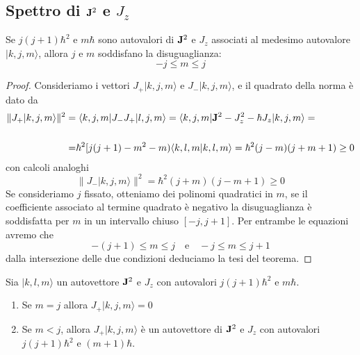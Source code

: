 \subsection{Spettro di $\bold{J}^2$ e $J_z$}

\begin{theorem}
Se $j(j+1)\hbar^2$ e $m\hbar$ sono autovalori di $\bold{J}^2$ e $J_z$ associati al medesimo autovalore $|k,j,m \rangle$, allora $j$ e $m$ soddisfano la disuguaglianza:
\begin{equation*}
	- j \leq m \leq j
\end{equation*}	
\end{theorem}
\begin{proof}
 Consideriamo i vettori $J_+|k,j,m \rangle$ e $J_-|k,j,m \rangle$, e il quadrato della norma \`e dato da 
 \begin{align*}
 	\|J_+|k,j,m \rangle \|^2 = & \; \langle k,j,m|J_-J_+ |l,j,m \rangle = \langle k,j,m|\bold{J}^2-J_z^2-\hbar J_z |k,j,m\rangle = \\[0.5cm]
 	= &\hbar^2[j(j+1)-m^2-m)\langle k,l,m|k,l,m\rangle = \hbar^2(j-m)(j+m+1) \geq 0
 \end{align*} 
 con calcoli analoghi
 \begin{equation*}
 	\|J_-|k,j,m \rangle \|^2 = \hbar^2(j+m)(j-m+1) \geq 0
 \end{equation*}
 Se consideriamo $j$ fissato, otteniamo dei polinomi quadratici in $m$, se il coefficiente associato al termine quadrato \`e negativo la disuguaglianza \`e soddisfatta per $m$ in un intervallo chiuso $[-j,j+1]$. Per entrambe le equazioni avremo che 
 \begin{equation*}
 	-(j+1) \leq m \leq j \quad \text{e} \quad -j \leq m \leq j+1
 \end{equation*}
 dalla intersezione delle due condizioni deduciamo la tesi del teorema.
 
\end{proof}

\begin{theorem}
	Sia $|k,l,m \rangle $ un autovettore $\bold{J}^2$ e $J_z$ con autovalori $j(j+1)\hbar^2$ e $m\hbar$.
	\begin{enumerate}
		\item Se $m=j$ allora $J_+|k,j,m \rangle = 0$
		\item Se $m < j$, allora $J_+|k,j,m \rangle$ \`e un autovettore di $\bold{J}^2$ e $J_z$ con autovalori $j(j+1)\hbar^2$ e $(m+1)\hbar$.
	\end{enumerate}
\end{theorem}

